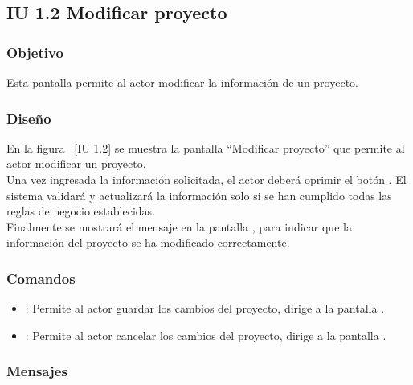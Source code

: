 \subsection{IU 1.2 Modificar proyecto}

\subsubsection{Objetivo}
	
    Esta pantalla permite al actor modificar la información de un proyecto.

\subsubsection{Diseño}

    En la figura ~\ref{IU 1.2} se muestra la pantalla ``Modificar proyecto'' que permite al actor modificar un proyecto.\\
    
    Una vez ingresada la información solicitada, el actor deberá oprimir el botón . El sistema validará y actualizará la 
    información solo si se han cumplido todas las reglas de negocio establecidas.  \\
    
    Finalmente se mostrará el mensaje  en la pantalla , 
    para indicar que la información del proyecto
    se ha modificado correctamente.        



\subsubsection{Comandos}
\begin{itemize}
	\item {}: Permite al actor guardar los cambios del proyecto, dirige a la pantalla .
	\item {}: Permite al actor cancelar los cambios del proyecto, dirige a la pantalla .
\end{itemize}

\subsubsection{Mensajes}
	
